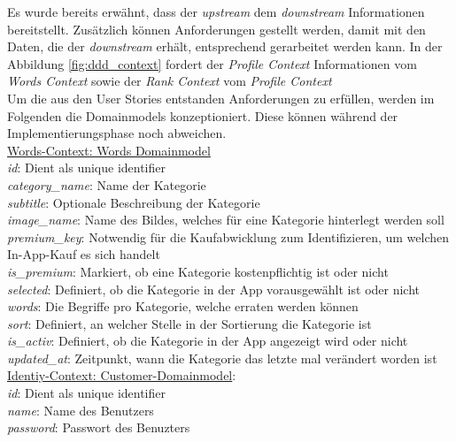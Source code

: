 {Es wurde bereits erwähnt, dass der \textit{upstream} dem \textit{downstream} Informationen bereitstellt. Zusätzlich können Anforderungen gestellt werden, damit mit den Daten, die der \textit{downstream} erhält, entsprechend gerarbeitet werden kann. In der Abbildung \ref{fig:ddd_context} fordert der \textit{Profile Context} Informationen vom \textit{Words Context} sowie der \textit{Rank Context} vom \textit{Profile Context}  \\

Um die aus den User Stories entstanden Anforderungen zu erfüllen, werden im Folgenden die Domainmodels konzeptioniert. Diese können während der Implementierungsphase noch abweichen. \\

\underline{Words-Context: Words Domainmodel}\\
\textit{id}: Dient als unique identifier\\
\textit{category\_name}: Name der Kategorie\\
\textit{subtitle}: Optionale Beschreibung der Kategorie\\
\textit{image\_name}: Name des Bildes, welches für eine Kategorie hinterlegt werden soll\\
\textit{premium\_key}: Notwendig für die Kaufabwicklung zum Identifizieren, um welchen In-App-Kauf es sich handelt\\
\textit{is\_premium}: Markiert, ob eine Kategorie kostenpflichtig ist oder nicht\\
\textit{selected}: Definiert, ob die Kategorie in der App vorausgewählt ist oder nicht\\
\textit{words}: Die Begriffe pro Kategorie, welche erraten werden können\\
\textit{sort}: Definiert, an welcher Stelle in der Sortierung die Kategorie ist\\
\textit{is\_activ}: Definiert, ob die Kategorie in der App angezeigt wird oder nicht\\
\textit{updated\_at}: Zeitpunkt, wann die Kategorie das letzte mal verändert worden ist \\

\underline{Identiy-Context: Customer-Domainmodel}:\\
\textit{id}: Dient als unique identifier \\
\textit{name}: Name des Benutzers\\
\textit{password}: Passwort des Benuzters\\

}
